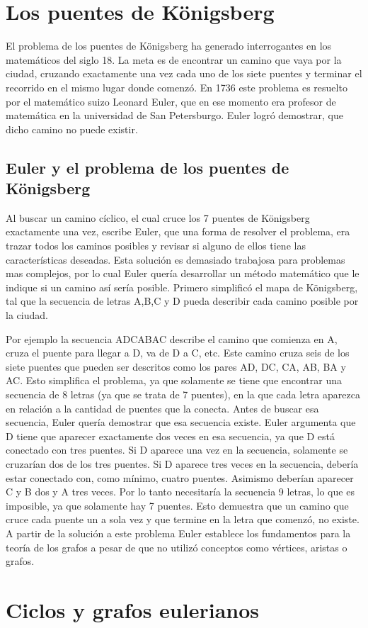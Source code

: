 \documentclass[12pt]{article}
\begin{document}
\section{Los puentes de K\"{o}nigsberg}
El problema de los puentes de K\"{o}nigsberg ha generado interrogantes en los matemáticos del siglo 18. La meta es de encontrar un camino que vaya por la ciudad, cruzando exactamente una vez cada uno de los siete puentes y terminar el recorrido en el mismo lugar donde comenzó. En 1736 este problema es resuelto por el matemático suizo Leonard Euler, que en ese momento era profesor de matemática en la universidad de San Petersburgo. Euler logró demostrar, que dicho camino no puede existir.
\subsection{Euler y el problema de los puentes de K\"{o}nigsberg}
Al buscar un camino cíclico, el cual cruce los 7 puentes de K\"{o}nigsberg exactamente una vez, escribe Euler, que una forma de resolver el problema, era trazar todos los caminos posibles y revisar si alguno de ellos tiene las características deseadas. Esta solución es demasiado trabajosa para problemas mas complejos, por lo cual Euler quería desarrollar un método matemático que le indique si un camino así sería posible. Primero simplificó el mapa de K\"{o}nigsberg, tal que la secuencia de letras A,B,C y D pueda describir cada camino posible por la ciudad.

Por ejemplo la secuencia ADCABAC describe el camino que comienza en A, cruza el puente para llegar a D, va de D a C, etc. Este camino cruza seis de los siete puentes que pueden ser descritos como los pares AD, DC, CA, AB, BA y AC.
Esto simplifica el problema, ya que solamente se tiene que encontrar una secuencia de 8 letras (ya que se trata de 7 puentes), en la que cada letra aparezca en relación a la cantidad de puentes que la conecta. Antes de buscar esa secuencia, Euler quería demostrar que esa secuencia existe. Euler argumenta que D tiene que aparecer exactamente dos veces en esa secuencia, ya que D está conectado con tres puentes. Si D aparece una vez en la secuencia, solamente se cruzarían dos de los tres puentes. Si D aparece tres veces en la secuencia, debería estar conectado con, como mínimo, cuatro puentes. Asimismo deberían aparecer C y B dos y A tres veces. Por lo tanto necesitaría la secuencia 9 letras, lo que es imposible, ya que solamente hay 7 puentes. Esto demuestra que un camino que cruce cada puente un a sola vez y que termine en la letra que comenzó, no existe. 
\\A partir de la solución a este problema Euler establece los fundamentos para la teoría de los grafos a pesar de que no utilizó conceptos como vértices, aristas o grafos.
\section{Ciclos y grafos eulerianos}
\end{document}
